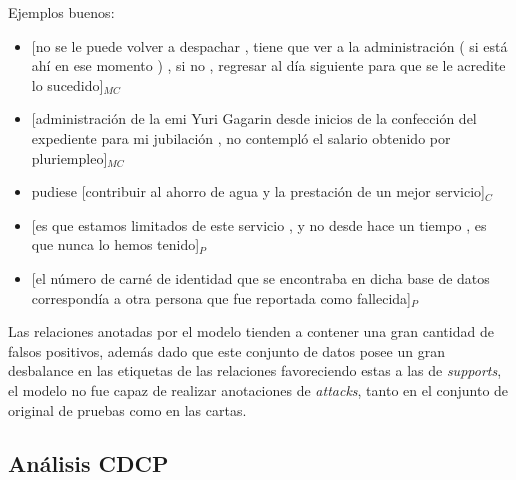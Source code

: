 Ejemplos buenos:
\begin{itemize}
	\item \text{} [no se le puede volver a despachar , tiene que ver a la administración ( si está ahí en ese momento ) , 
	si no , regresar al día siguiente para que se le acredite lo sucedido]$_{MC}$ %
	\item \text{} [administración de la emi Yuri Gagarin desde inicios de la confección del expediente para 
	mi jubilación , no contempló el salario obtenido por pluriempleo]$_{MC}$ %
	\item pudiese [contribuir al ahorro de agua y la prestación de un mejor servicio]$_C$ %
	\item \text{} [es que estamos limitados de este servicio , y no desde hace un tiempo , es que nunca lo hemos tenido]$_P$ %
	\item \text{} [el número de carné de identidad que se encontraba en dicha base de datos correspondía a otra persona que
	fue reportada como fallecida]$_P$ %
\end{itemize}

Las relaciones anotadas por el modelo tienden a contener una gran cantidad de falsos positivos, además
dado que este conjunto de datos posee un gran desbalance en las etiquetas de las relaciones favoreciendo 
estas a las de \emph{supports}, el modelo no fue capaz de realizar anotaciones de \emph{attacks}, tanto en 
el conjunto de original de pruebas como en las cartas.

\subsection{Análisis CDCP}



